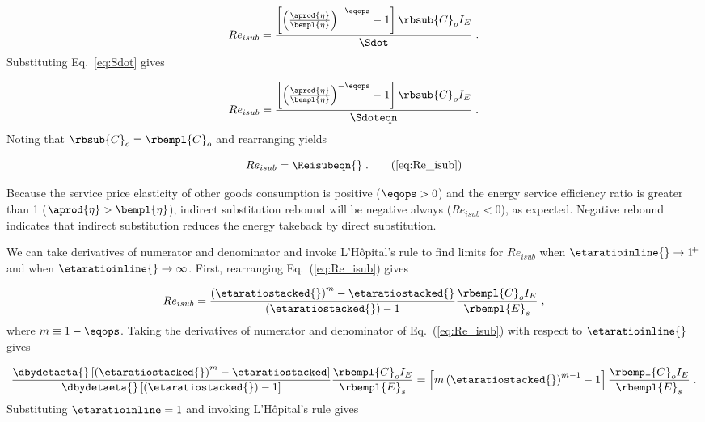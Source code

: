 \begin{equation}
  Re_{isub} = \frac{\left[ \left( \frac{\aprod{\eta}}{\bempl{\eta}} \right)^{-\eqops} - 1  \right] \rbsub{C}_o I_E} {\Sdot} \; .
\end{equation}
%
Substituting Eq.~\ref{eq:Sdot} gives

\begin{equation}
  Re_{isub} = \frac{\left[ \left(\frac{\aprod{\eta}}{\bempl{\eta}} \right)
                  ^{-\eqops} - 1  \right] \rbsub{C}_o I_E}
                  {\Sdoteqn} \; .
\end{equation}
%
Noting that $\rbsub{C}_o = \rbempl{C}_o$ and rearranging yields

\begin{equation}
  Re_{isub} = \Reisubeqn{} \; . \tag{\ref{eq:Re_isub}}
\end{equation}

Because the service price elasticity of other goods consumption is positive ($\eqops > 0$) and
the energy service efficiency ratio is greater than 1 ($\aprod{\eta} > \bempl{\eta}$),
indirect substitution rebound will be negative always ($Re_{isub} < 0$),
as expected.
Negative rebound indicates that indirect substitution reduces the energy takeback by direct substitution.

We can take derivatives of numerator and denominator and
invoke L'H\^{o}pital's rule
to find limits for $Re_{isub}$ when
$\etaratioinline{} \to 1^{\! +}$ and when
$\etaratioinline{} \to \infty$.
First, rearranging Eq.~(\ref{eq:Re_isub}) gives

\begin{equation}
  Re_{isub} = \frac{\left( \etaratiostacked{} \right)^m - \etaratiostacked{}}{\left( \etaratiostacked{} \right) - 1} \frac{\rbempl{C}_o I_E}{\rbempl{E}_s} \; ,
\end{equation}
%
where $m \equiv 1 - \eqops$.
Taking the derivatives of numerator and denominator of Eq.~(\ref{eq:Re_isub})
with respect to $\etaratioinline{}$ gives

\begin{equation}
  \frac{\dbydetaeta{} \left[ \left( \etaratiostacked{} \right)^m - \etaratiostacked \right]}
            {\dbydetaeta{}\left[ \left( \etaratiostacked{} \right)  - 1 \right] } \frac{\rbempl{C}_o I_E}{\rbempl{E}_s} 
       = \left[ m \left( \etaratiostacked{} \right)^{m-1} - 1 \right] \frac{\rbempl{C}_o I_E}{\rbempl{E}_s} \; .
\end{equation}
%
Substituting $\etaratioinline = 1$ and invoking L'H\^{o}pital's rule gives

